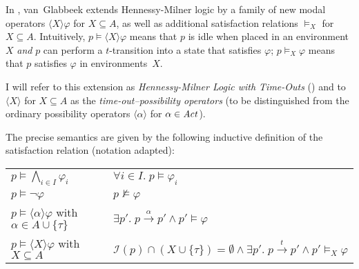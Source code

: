 %
\begin{isabellebody}%
%
%
\isadelimtheory
%
\endisadelimtheory
%
\isatagtheory
%
\endisatagtheory
{\isafoldtheory}%
%
\isadelimtheory
%
\endisadelimtheory
%
\isadelimdocument
%
\endisadelimdocument
%
\isatagdocument
%
\isamarkuptrue%
%
\endisatagdocument
{\isafolddocument}%
%
\isadelimdocument
%
\endisadelimdocument
%
\begin{isamarkuptext}%
\label{sec:HMLt}%
\end{isamarkuptext}\isamarkuptrue%
%
\begin{isamarkuptext}%
In \cite[section 3]{rbs}, van~Glabbeek extends Hennessy-Milner logic by a family of new modal operators $\langle X \rangle \varphi$ for $X \subseteq A$, as well as additional satisfaction relations $\vDash_X$ for $X \subseteq A$. Intuitively, $p \vDash \langle X \rangle \varphi$ means that $p$ is idle when placed in an environment~$X$ \emph{and} $p$ can perform a $t$-transition into a state that satisfies $\varphi$; $p \vDash_X \varphi$ means that $p$ satisfies $\varphi$ in environments~$X$.

I will refer to this extension as \emph{Hennessy-Milner Logic with Time-Outs} (\HMLt{}) and to $\langle X \rangle$ for $X \subseteq A$ as the \emph{time-out--possibility operators} (to be distinguished from the ordinary possibility operators $\langle \alpha \rangle$ for $\alpha \in \mathit{Act}$).

The precise semantics are given by the following inductive definition of the satisfaction relation \cite[section 3]{rbs} (notation adapted):

\begin{tabular}{l l l}
    $p \vDash \bigwedge_{i \in I} \varphi_i$ 
    & \text{if} 
    & $\forall i \in I.\; p \vDash \varphi_i$ \\
    
    $p \vDash \neg\varphi$
    & \text{if} 
    & $p \not\vDash \varphi$ \\
    
    $p \vDash \langle \alpha \rangle \varphi$ \quad with $\alpha \in A \cup \{\tau\}$
    & \text{if} 
    & $\exists p'.\; p \xrightarrow{\alpha} p' \wedge p' \vDash \varphi$ \\
    
    $p \vDash \langle X \rangle \varphi$ \quad with $X \subseteq A$
    & \text{if} 
    & $\mathcal{I}(p) \cap (X \cup \{\tau\}) = \emptyset \wedge \exists p'.\; p \xrightarrow{t} p' \wedge p' \vDash_X \varphi$ \\[1em]
    

\end{tabular}
\end{isamarkuptext}
\end{isabellebody}
